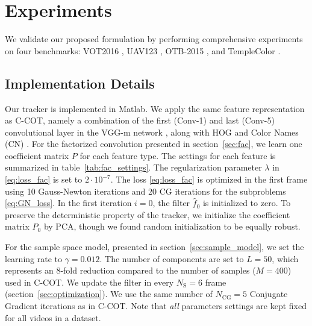 \documentclass[10pt,twocolumn,letterpaper]{article}
\begin{document}
\section{Experiments}
We validate our proposed formulation by performing comprehensive experiments on
four benchmarks: VOT2016 \cite{VOT2016}, UAV123 \cite{UAV123}, OTB-2015 \cite{OTB2015}, and TempleColor \cite{TempleColor}.

\begin{table}[!t]
	\centering
	\vspace{1mm}\caption{The settings of the proposed factorized convolution approach, as employed in our experiments. For each feature, we show the dimensionality $D$ and the number of filters $C$.}\label{tab:fac_settings}\vspace{-3mm}
\end{table}


\subsection{Implementation Details}
\label{sec:details}
Our tracker is implemented in Matlab. We apply the same feature representation as C-COT, namely a combination of the first (Conv-1) and last (Conv-5) convolutional layer in the VGG-m network \cite{Chatfield14}, along with HOG \cite{Dalal05} and Color Names (CN) \cite{Weijer09a}. For the factorized convolution presented in section~\ref{sec:fac}, we learn one coefficient matrix $P$ for each feature type. The settings for each feature is summarized in table~\ref{tab:fac_settings}. The regularization parameter $\lambda$ in \eqref{eq:loss_fac} is set to $2 \cdot 10^{-7}$. The loss \eqref{eq:loss_fac} is optimized in the first frame using 10 Gauss-Newton iterations and 20 CG iterations for the subproblems \eqref{eq:GN_loss}. In the first iteration $i=0$, the filter $\hat{f}_0$ is initialized to zero. To preserve the deterministic property of the tracker, we initialize the coefficient matrix $P_0$ by PCA, though we found random initialization to be equally robust.

For the sample space model, presented in section~\ref{sec:sample_model}, we set the learning rate to $\gamma = 0.012$. The number of components are set to $L = 50$, which represents an 8-fold reduction compared to the number of samples ($M=400$) used in C-COT. We update the filter in every $N_\text{S} = 6$ frame (section~\ref{sec:optimization}). We use the same number of $N_\text{CG} = 5$ Conjugate Gradient iterations as in C-COT. Note that \emph{all} parameters settings are kept fixed for all videos in a dataset.
\end{document}
